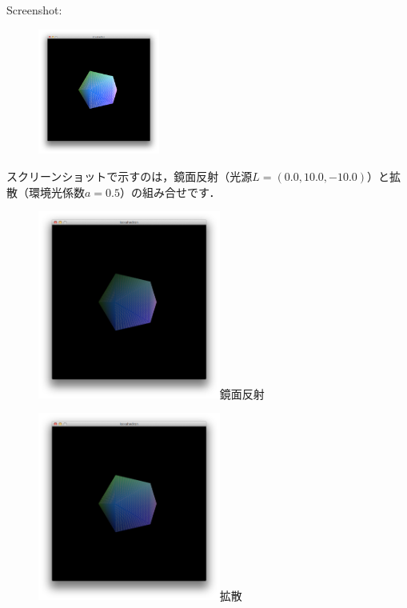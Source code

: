 \documentclass[a4paper,11pt]{jsarticle}
\numberwithin{theorem}{section}  %
\numberwithin{equation}{section} %
\begin{document}
Screenshot:
\begin{figure}[H]
\includegraphics[bb=0 0 444 1200,width=4cm]{Icosahedron_a_and_b.pdf}
\end{figure}
スクリーンショットで示すのは，鏡面反射（光源$L=(0.0,10.0,-10.0)$）と拡散（環境光係数$a=0.5$）の組み合せです．
\begin{figure}[H]
\includegraphics[bb=0 0 444 751,width=6cm]{Icosahedron_a.pdf}鏡面反射
\end{figure}
\begin{figure}[H]
\includegraphics[bb=0 0 444 751,width=6cm]{Icosahedron_b.pdf}拡散
\end{figure}
\end{document}
